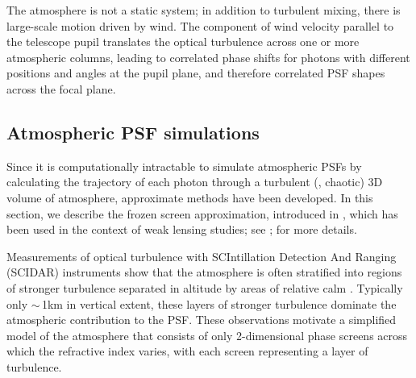 \documentclass[twocolumn]{aastex631}
\begin{document}
The atmosphere is not a static system; in addition to turbulent mixing, there is large-scale motion driven by wind.
The component of wind velocity parallel to the telescope pupil  translates the optical turbulence across one or more atmospheric columns, leading to correlated phase shifts for photons with different positions and angles at the pupil plane, and therefore correlated PSF shapes across the focal plane. 


\subsection{Atmospheric PSF simulations} \label{sec:sim}
Since it is computationally intractable to simulate atmospheric PSFs by calculating the trajectory of each photon through a turbulent (\ie, chaotic) 3D volume of atmosphere, approximate methods have been developed. 
In this section, we describe the frozen screen approximation, introduced in , which has been used in the context of weak lensing studies; see \cite{jee_toward_2011, peterson_simulation_2015}; \dcii for more details.

Measurements of optical turbulence with SCIntillation Detection And Ranging (SCIDAR) instruments show that the atmosphere is often stratified into regions of stronger turbulence separated in altitude by areas of relative calm  \citep{osborn_optical_2018, osborn_atmospheric_2018}.
Typically only $\sim\,$1\unit{km} in vertical extent, these layers of stronger turbulence dominate the atmospheric contribution to the PSF. 
These observations motivate a simplified model of the atmosphere that consists of only 2-dimensional phase screens across which the refractive index varies, with each screen representing a layer of turbulence.
\end{document}
